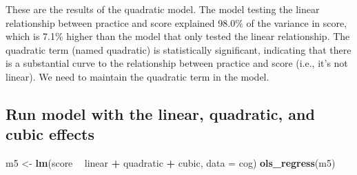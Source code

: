 \documentclass[]{article}
\newenvironment{Shaded}{\begin{snugshade}}{\end{snugshade}}
\newcommand{\KeywordTok}[1]{\textcolor[rgb]{0.13,0.29,0.53}{\textbf{#1}}}
\newcommand{\DataTypeTok}[1]{\textcolor[rgb]{0.13,0.29,0.53}{#1}}
\newcommand{\StringTok}[1]{\textcolor[rgb]{0.31,0.60,0.02}{#1}}
\newcommand{\OperatorTok}[1]{\textcolor[rgb]{0.81,0.36,0.00}{\textbf{#1}}}
\newcommand{\NormalTok}[1]{#1}
\begin{document}
These are the results of the quadratic model. The model testing the
linear relationship between practice and score explained 98.0\% of the
variance in score, which is 7.1\% higher than the model that only tested
the linear relationship. The quadratic term (named quadratic) is
statistically significant, indicating that there is a substantial curve
to the relationship between practice and score (i.e., it's not linear).
We need to maintain the quadratic term in the model.

\subsection{Run model with the linear, quadratic, and cubic
effects}\label{run-model-with-the-linear-quadratic-and-cubic-effects}

\begin{Shaded}
\begin{Highlighting}[]
\NormalTok{m5 <-}\StringTok{ }\KeywordTok{lm}\NormalTok{(score }\OperatorTok{~}\StringTok{ }\NormalTok{linear }\OperatorTok{+}\StringTok{ }\NormalTok{quadratic }\OperatorTok{+}\StringTok{ }\NormalTok{cubic, }\DataTypeTok{data =}\NormalTok{ cog)}
\KeywordTok{ols_regress}\NormalTok{(m5)}
\end{Highlighting}
\end{Shaded}
\end{document}
